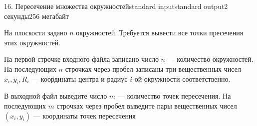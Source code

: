\begin{problem}{16. Пересечение множества окружностей}{standard input}{standard output}{2 секунды}{256 мегабайт}

На плоскости задано $n$ окружностей. Требуется вывести все точки пресечения этих окружностей.

\InputFile

На первой строчке входного файла записано число $n$ --- количество окружностей. На последующих $n$ строчках через пробел записаны три вещественных чисел $x_i, y_i, R_i$ --- координаты центра и радиус $i$-ой окружности соответственно.

\OutputFile

В выходной файл выведите число $m$ --- количество точек пересечения. На последующих $m$ строчках через пробел выведите пары вещественных чисел $(x_i, y_i)$ --- координаты точек пересечения

\Examples

\begin{example}%
%
\end{example}

\end{problem}
